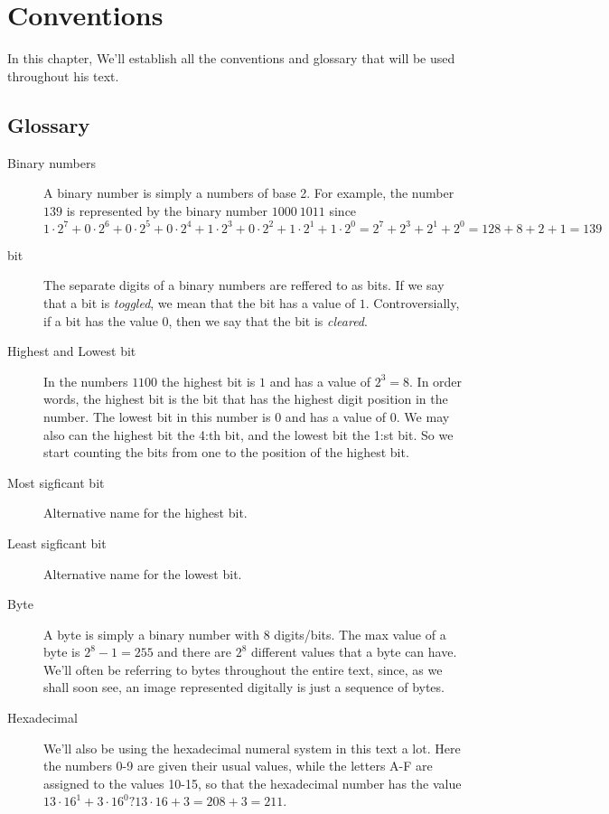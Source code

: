 \begin{comment}
  
\end{comment}

\chapter{Conventions}
\label{cha:pseudocode-convent}

In this chapter, We'll establish all the conventions and glossary that
will be used throughout his text.

\section{Glossary}

\begin{description}
\item[Binary numbers] A binary number is simply a numbers of base
  2. For example, the number $139$ is represented by the binary number
  $1000\ 1011$ since $1 \cdot  2^7 + 0 \cdot 2^6 + 0 \cdot 2^5 + 0
  \cdot 2^4 + 1 \cdot 2^3 + 0 \cdot 2^2 + 1 \cdot 2^1 + 1 \cdot 2^0 =
  2^7 + 2^3 + 2^1 + 2^0 = 128 + 8 + 2 + 1 = 139 $

\item[bit] The separate digits of a binary numbers are reffered to as
  bits. If we say that a bit is \textit{toggled}, we mean that the bit has a
  value of $1$. Controversially, if a bit has the value $0$, then we say
  that the bit is \textit{cleared}.
\item[Highest and Lowest bit] In the numbers $1100$ the highest bit is
  $1$ and has a value of $2^3 = 8$. In order words, the highest bit is
  the bit that has the highest digit position in the number. The
  lowest bit in this number is $0$ and has a value of $0$. We may also
  can the highest bit the 4:th bit, and the lowest bit the 1:st
  bit. So we start counting the bits from one to the position of the
  highest bit.
\item[Most sigficant bit] Alternative name for the highest bit.
\item[Least sigficant bit] Alternative name for the lowest bit.

\item[Byte] A byte is simply a binary number with 8 digits/bits. The
  max value of a byte is $2^8 - 1 = 255$ and there are $2^8$ different
  values that a byte can have. We'll often be referring to bytes
  throughout the entire text, since, as we shall soon see, an image
  represented digitally is just a sequence of bytes.


\item[Hexadecimal] We'll also be using the hexadecimal numeral system
  in this text a lot. Here the numbers 0-9 are given their usual
  values, while the letters A-F are assigned to the values 10-15, so
  that the hexadecimal number  has the value $13 \cdot 16^1 + 3 \cdot
  16^0 ? 13 \cdot 16 + 3 = 208 + 3 =  211$.

\end{description}

